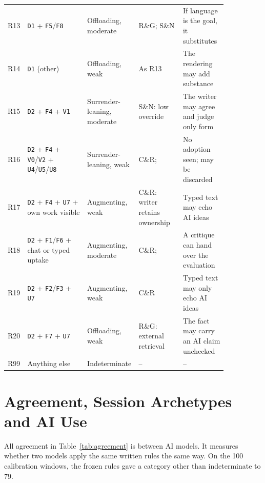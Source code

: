 \documentclass[manuscript,screen]{acmart}
\newcommand{\code}[1]{\texttt{#1}}
\begin{document}
{\begin{longtable}{p{0.05\linewidth}p{0.27\linewidth}p{0.13\linewidth}p{0.20\linewidth}p{0.20\linewidth}}
R13 & \code{D1} + \code{F5}/\code{F8} & Offloading, moderate & R\&G; S\&N & If language is the goal, it substitutes \\
R14 & \code{D1} (other) & Offloading, weak & As R13 & The rendering may add substance \\
R15 & \code{D2} + \code{F4} + \code{V1} & Surrender-leaning, moderate & S\&N: low override & The writer may agree and judge only form \\
R16 & \code{D2} + \code{F4} + \code{V0}/\code{V2} + \code{U4}/\code{U5}/\code{U8} & Surrender-leaning, weak & C\&R; \cite{bastani2025} & No adoption seen; may be discarded \\
R17 & \code{D2} + \code{F4} + \code{U7} + own work visible & Augmenting, weak & C\&R: writer retains ownership & Typed text may echo AI ideas \\
R18 & \code{D2} + \code{F1}/\code{F6} + chat or typed uptake & Augmenting, moderate & C\&R; \cite{maier2026} & A critique can hand over the evaluation \\
R19 & \code{D2} + \code{F2}/\code{F3} + \code{U7} & Augmenting, weak & C\&R & Typed text may only echo AI ideas \\
R20 & \code{D2} + \code{F7} + \code{U7} & Offloading, weak & R\&G: external retrieval & The fact may carry an AI claim unchecked \\
R99 & Anything else & Indeterminate & -- & -- \\
\bottomrule
\end{longtable}
}

\clearpage
\section{Agreement, Session Archetypes and AI Use}
\label{app:support}

All agreement in Table~\ref{tab:agreement} is between AI models. It measures whether two models apply the same written rules the same way. On the 100 calibration windows, the frozen rules gave a category other than indeterminate to 79.
\end{document}
